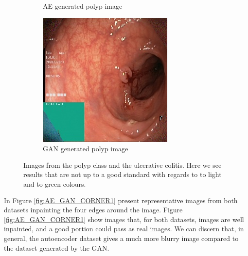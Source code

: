 \begin{figure}[h]
\begin{subfigure}[t]{\myfigsizethree}
            \caption{AE generated polyp image }   
            \label{fig:z_AE_CORNER2}
        \end{subfigure}
        \qquad%
        \begin{subfigure}[t]{\myfigsizethree}   
            \centering 
            \includegraphics[width=\textwidth]{experiments/figures/blackcorner/polypwithgreenGAN.jpg}
            \caption{GAN generated polyp image}   
            \label{fig:z_GAN_CORNER2}
        \end{subfigure}
        \caption{Images from the polyp class and the ulcerative colitis. Here we see results that are not up to a good standard with regards to to light and to green colours.} 
        \label{fig:AE_GAN_CORNER2}
\end{figure}
    
In Figure \ref{fig:AE_GAN_CORNER1} present representative images from both datasets inpainting the four edges around the image. Figure \ref{fig:AE_GAN_CORNER1} show images that, for both datasets, images are well inpainted, and a good portion could pass as real images. We can discern that, in general, the autoencoder dataset gives a much more blurry image compared to the dataset generated by the GAN. 

